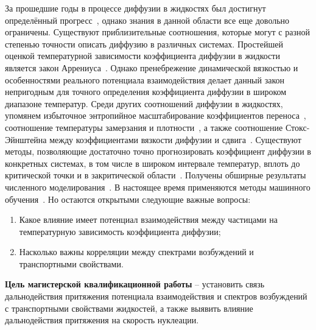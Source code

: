За прошедшие годы в процессе диффузии в жидкостях был достигнут определённый прогресс~\cite{FrenkelBook,HansenBook,GrootBook,MarchBook}, однако знания в данной области все еще довольно ограничены.
Существуют приблизительные соотношения, которые могут с разной степенью точности описать диффузию в различных системах.
Простейшей оценкой температурной зависимости коэффициента диффузии в жидкости является закон Аррениуса~\cite{10.1126/science.278.5336.257}.
Однако пренебрежение динамической вязкостью и особенностями реального потенциала взаимодействия делает данный закон непригодным для точного определения коэффициента диффузии в широком диапазоне температур.
Среди других соотношений диффузии в жидкостях, упомянем избыточное энтропийное масштабирование коэффициентов переноса~\cite{10.1103/physreva.15.2545, 10.1038/381137a0, 10.1063/1.5055064}, соотношение температуры замерзания и плотности~\cite{10.1103/physreve.62.7524, 10.1063/1.5022058, 10.1063/1.5044703, 10.1103/physreve.103.042122}, а также соотношение Стокс-Эйнштейна между коэффициентами вязкости диффузии и сдвига~\cite{10.1063/1.446338, 10.1002/BBPC.19900940313, 10.1103/physreve.95.052122, 10.1063/1.5080662, 10.1080/00268976.2019.1643045}.
Существуют методы, позволяющие достаточно точно прогнозировать коэффициент диффузии в конкретных системах, в том числе в широком интервале температур, вплоть до критической точки и в закритической области~\cite{10.1063/1.1607953, 10.1016/j.camwa.2019.11.012, 10.1063/1.441097}.
Получены обширные результаты численного моделирования~\cite{10.1063/1.1786579, 10.1016/j.fluid.2011.03.002}.
В настоящее время применяются методы машинного обучения~\cite{10.1063/5.0011512}.
Но остаются открытыми следующие важные вопросы:
\begin{enumerate}
\item Какое влияние имеет потенциал взаимодействия между частицами на температурную зависимость коэффициента диффузии;
\item Насколько важны корреляции между спектрами возбуждений и транспортными свойствами.
\end{enumerate}

\newpage

\textbf{Цель магистерской квалификационной работы} -- установить связь \\ дальнодействия притяжения потенциала взаимодействия и спектров возбуждений с транспортными свойствами жидкостей, а также выявить влияние дальнодействия притяжения на скорость нуклеации.

